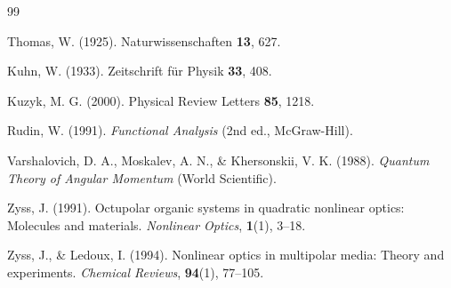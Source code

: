 \documentclass[11pt]{article}
\begin{document}
\begin{thebibliography}{99}

 Thomas, W. (1925). Naturwissenschaften \textbf{13}, 627.

 Kuhn, W. (1933). Zeitschrift für Physik \textbf{33}, 408.

 Kuzyk, M. G. (2000). Physical Review Letters \textbf{85}, 1218.

 Rudin, W. (1991). \textit{Functional Analysis} (2nd ed., McGraw-Hill).

 Varshalovich, D. A., Moskalev, A. N., \& Khersonskii, V. K. (1988). \textit{Quantum Theory of Angular Momentum} (World Scientific).

 Zyss, J. (1991). Octupolar organic systems in quadratic nonlinear optics: Molecules and materials. \textit{Nonlinear Optics}, \textbf{1}(1), 3--18.

 Zyss, J., \& Ledoux, I. (1994). Nonlinear optics in multipolar media: Theory and experiments. \textit{Chemical Reviews}, \textbf{94}(1), 77--105.

\end{thebibliography}
\end{document}
